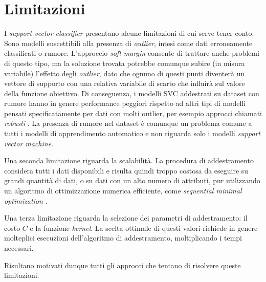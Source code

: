 \section{Limitazioni}\label{sec:svc_limiti}
I \emph{support vector classifier} presentano alcune limitazioni di cui serve tener conto. 
Sono modelli suscettibili alla presenza di \emph{outlier}, intesi come dati erroneamente classificati o rumore. L'approccio \emph{soft-margin} consente di trattare anche problemi di questo tipo, ma la soluzione trovata potrebbe comunque subire (in misura variabile) l'effetto degli \emph{outlier}, dato che ognuno di questi punti diventerà un vettore di supporto con una relativa variabile di scarto che influirà sul valore della funzione obiettivo. 
Di conseguenza, i modelli SVC addestrati su dataset con rumore hanno in genere performance peggiori rispetto ad altri tipi di modelli pensati specificatamente per dati con molti outlier, per esempio approcci chiamati \emph{robusti} \cite{2019_robust_classification}.
La presenza di rumore nel dataset è comunque un problema comune a tutti i modelli di apprendimento automatico e non riguarda solo i modelli \emph{support vector machine}.

Una seconda limitazione riguarda la scalabilità. La procedura di addestramento considera tutti i dati disponibili e risulta quindi troppo costosa da eseguire su grandi quantità di dati, o su dati con un alto numero di attributi, pur utilizzando un algoritmo di ottimizzazione numerica efficiente, come \emph{sequential minimal optimization} \cite{SMO}.

Una terza limitazione riguarda la selezione dei parametri di addestramento: il costo $C$ e la funzione \emph{kernel}. La scelta ottimale di questi valori richiede in genere molteplici esecuzioni dell'algoritmo di addestramento, moltiplicando i tempi necessari.

Risultano motivati dunque tutti gli approcci che tentano di risolvere queste limitazioni. 

